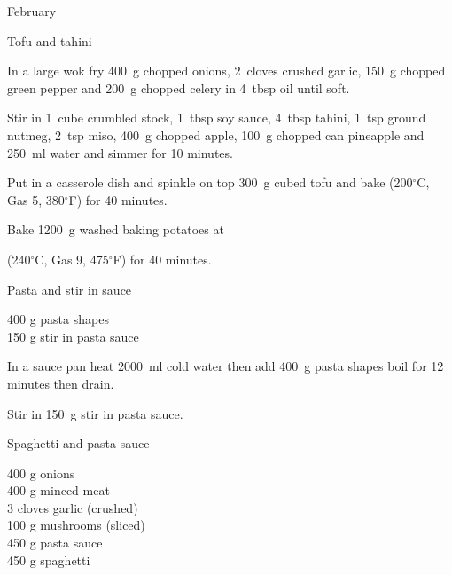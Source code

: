 \begin{menu}{February}
\begin{recipe}{2}{Tofu and tahini}
\begin{ingredients}
		\end{ingredients}
	
    \begin{instructions}
    \item 
        In a large wok fry
        400~g chopped onions,
        2~cloves crushed garlic,
        150~g chopped green pepper
        and
        200~g chopped celery
        in
        4~tbsp  oil
        until soft.
      \item 
        Stir in
        1~cube crumbled stock,
        1~tbsp  soy sauce,
        4~tbsp  tahini,
        1~tsp  ground nutmeg,
        2~tsp  miso,
        400~g chopped apple,
        100~g chopped can pineapple
        and
        250~ml  water
        and simmer for 10 minutes.
      \item 
        Put in a casserole dish
        and spinkle on top
        300~g cubed tofu
        and bake 
      (200$^{\circ}$C, Gas 5, 380$^{\circ}$F)
     for 40 minutes.
      \item 
      Bake 1200~g washed baking potatoes
      at
      
      (240$^{\circ}$C, Gas 9, 475$^{\circ}$F)
     for 40 minutes.
    
    \end{instructions}
    \end{recipe}%
  
    \begin{recipe}{1}{Pasta and stir in sauce}%
    
		\begin{ingredients}
		400 g pasta shapes  \\
	150 g stir in pasta sauce  \\
	
		\end{ingredients}
	
    \begin{instructions}
    \item 
      In a sauce pan heat
      2000~ml  cold water then add
      400~g  pasta shapes
      boil for 12
      minutes then drain.
    \item 
        Stir in
        150~g  stir in pasta sauce.
      
    \end{instructions}
    \end{recipe}%
  
    \begin{recipe}{2}{Spaghetti and pasta sauce}%
    
		\begin{ingredients}
		400 g onions  \\
	400 g minced meat  \\
	3 cloves garlic (crushed) \\
	100 g mushrooms (sliced) \\
	450 g pasta sauce  \\
	450 g spaghetti  \\
	

\end{ingredients}
\end{recipe}
\end{menu}
